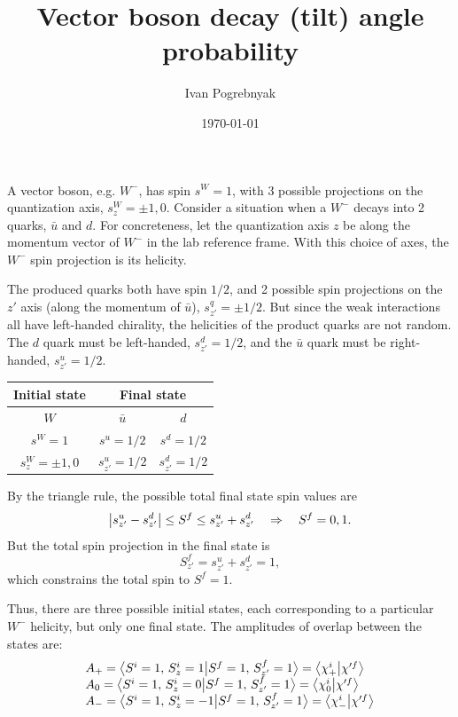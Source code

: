 \documentclass[12pt]{article}
\title{Vector boson decay (tilt) angle probability}
\author{Ivan Pogrebnyak}
\date{\today}
\begin{document}
\maketitle

A vector boson, e.g. $W^-$, has spin $s^W=1$, with 3 possible projections on the quantization axis, $s^W_z=\pm 1,0$.
Consider a situation when a $W^-$ decays into 2 quarks, $\bar{u}$ and $d$. For concreteness, let the quantization axis $z$ be along the momentum vector of $W^-$ in the lab reference frame. With this choice of axes, the $W^-$ spin projection is its helicity.

The produced quarks both have spin $1/2$, and 2 possible spin projections on the $z'$ axis (along the momentum of $\bar{u}$), $s^q_{z'}=\pm 1/2$. But since the weak interactions all have left-handed chirality, the helicities of the product quarks are not random. The $d$ quark must be left-handed, $s^d_{z'}=1/2$, and the $\bar{u}$ quark must be right-handed, $s^u_{z'}=1/2$.

\begin{table}[H]\centering
\begin{tabular}{c|c c}
  Initial state & \multicolumn{2}{c}{Final state} \\ \hline
  $W$ & $\bar{u}$ & $d$ \\
  $s^W=1$ & $s^u=1/2$ & $s^d=1/2$ \\
  $s^W_z=\pm 1,0$ & $s^u_{z'}=1/2$ & $s^d_{z'}=1/2$ \\
\end{tabular}
\end{table}

By the triangle rule, the possible total final state spin values are
\begin{equation}
  \left|s^u_{z'}-s^d_{z'}\right| \leq S^f \leq s^u_{z'}+s^d_{z'}
  \quad \Rightarrow \quad
  S^f = 0,1.
\end{equation}
%
But the total spin projection in the final state is
\begin{equation}
  S^f_{z'} = s^u_{z'} + s^d_{z'} = 1,
\end{equation}
which constrains the total spin to $S^f = 1$.

Thus, there are three possible initial states, each corresponding to a particular $W^-$ helicity, but only one final state. The amplitudes of overlap between the states are:
\begin{equation}\label{eq:overlap}
  \begin{array}{l}
    A_+ = \big<S^i=1,\, S^i_z= 1\big|S^f=1,\, S^f_{z'}=1\big> = \big<\chi^i_+\big|\chi'^f\big> \\
    A_0 = \big<S^i=1,\, S^i_z= 0\big|S^f=1,\, S^f_{z'}=1\big> = \big<\chi^i_0\big|\chi'^f\big> \\
    A_- = \big<S^i=1,\, S^i_z=-1\big|S^f=1,\, S^f_{z'}=1\big> = \big<\chi^i_-\big|\chi'^f\big>
  \end{array}
\end{equation}
\end{document}

